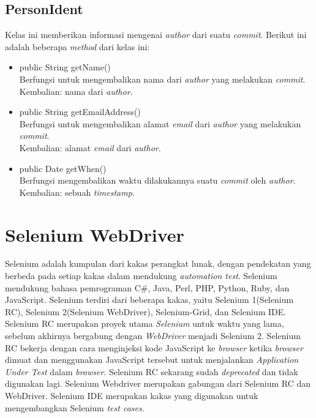 \subsection{PersonIdent}
\label{subsec:personident}
Kelas ini memberikan informasi mengenai \textit{author} dari suatu \textit{commit}. Berikut ini adalah beberapa \textit{method} dari kelas ini:
\begin{itemize}
\item public String getName()\\
Berfungsi untuk mengembalikan nama dari \textit{author} yang melakukan \textit{commit}.\\
Kembalian: nama dari \textit{author}.

\item public String getEmailAddress()\\
Berfungsi untuk mengembalikan alamat \textit{email} dari \textit{author} yang melakukan \textit{commit}.\\
Kembalian: alamat \textit{email} dari \textit{author}.

\item public Date getWhen()\\
Berfungsi mengembalikan waktu dilakukannya suatu \textit{commit} oleh \textit{author}.\\
Kembalian: sebuah \textit{timestamp}.
\end{itemize}


\section{Selenium WebDriver}
\label{sec:selenium_webdriver}
Selenium adalah kumpulan dari kakas perangkat lunak, dengan pendekatan yang berbeda pada setiap kakas dalam mendukung \textit{automation test}\cite{Selenium_doc}. Selenium mendukung bahasa pemrograman C\#, Java, Perl, PHP, Python, Ruby, dan JavaScript. Selenium terdiri dari beberapa kakas, yaitu Selenium 1(Selenium RC), Selenium 2(Selenium WebDriver), Selenium-Grid, dan Selenium IDE. Selenium RC merupakan proyek utama \textit{Selenium} untuk waktu yang lama, sebelum akhirnya bergabung dengan \textit{WebDriver} menjadi Selenium 2. Selenium RC bekerja dengan cara menginjeksi kode JavaScript ke \textit{browser} ketika \textit{browser} dimuat dan menggunakan JavaScript tersebut untuk menjalankan \textit{Application Under Test} dalam \textit{browser}. Selenium RC sekarang sudah \textit{deprecated} dan tidak digunakan lagi. Selenium Webdriver merupakan gabungan dari Selenium RC dan WebDriver. Selenium IDE merupakan kakas yang digunakan untuk mengembangkan Selenium \textit{test cases}.

